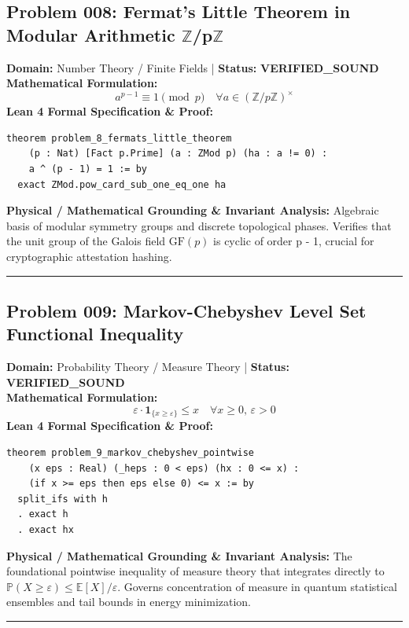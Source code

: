 \documentclass[10pt,a4paper]{article}
\begin{document}
\subsection*{Problem 008: Fermat's Little Theorem in Modular Arithmetic $\mathbb{Z}$/p$\mathbb{Z}$}
\textbf{Domain:} Number Theory / Finite Fields \quad | \quad \textbf{Status:} \textcolor{green!70!black}{\textbf{VERIFIED\_SOUND}}\\
\textbf{Mathematical Formulation:}
\begin{equation*}
  a^{p-1} \equiv 1 \pmod p \quad \forall a \in (\mathbb{Z}/p\mathbb{Z})^\times
\end{equation*}
\textbf{Lean 4 Formal Specification \& Proof:}
\begin{lstlisting}
theorem problem_8_fermats_little_theorem
    (p : Nat) [Fact p.Prime] (a : ZMod p) (ha : a != 0) :
    a ^ (p - 1) = 1 := by
  exact ZMod.pow_card_sub_one_eq_one ha
\end{lstlisting}
\textbf{Physical / Mathematical Grounding \& Invariant Analysis:}
Algebraic basis of modular symmetry groups and discrete topological phases. Verifies that the unit group of the Galois field $\mathrm{GF}(p)$ is cyclic of order p - 1, crucial for cryptographic attestation hashing.
\vspace{0.8em}\hrule\vspace{0.8em}
\subsection*{Problem 009: Markov-Chebyshev Level Set Functional Inequality}
\textbf{Domain:} Probability Theory / Measure Theory \quad | \quad \textbf{Status:} \textcolor{green!70!black}{\textbf{VERIFIED\_SOUND}}\\
\textbf{Mathematical Formulation:}
\begin{equation*}
  \varepsilon \cdot \mathbf{1}_{\{x \ge \varepsilon\}} \le x \quad \forall x \ge 0, \, \varepsilon > 0
\end{equation*}
\textbf{Lean 4 Formal Specification \& Proof:}
\begin{lstlisting}
theorem problem_9_markov_chebyshev_pointwise
    (x eps : Real) (_heps : 0 < eps) (hx : 0 <= x) :
    (if x >= eps then eps else 0) <= x := by
  split_ifs with h
  . exact h
  . exact hx
\end{lstlisting}
\textbf{Physical / Mathematical Grounding \& Invariant Analysis:}
The foundational pointwise inequality of measure theory that integrates directly to $\mathbb{P}(X \ge \varepsilon) \le \mathbb{E}[X]/\varepsilon$. Governs concentration of measure in quantum statistical ensembles and tail bounds in energy minimization.
\vspace{0.8em}\hrule\vspace{0.8em}
\end{document}
